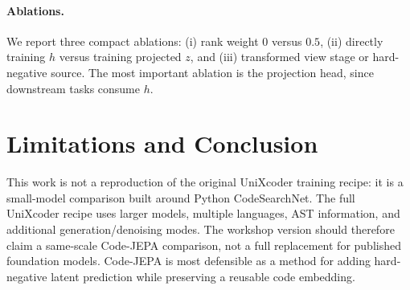 \documentclass[11pt]{article}
\begin{document}
\paragraph{Ablations.}
We report three compact ablations: (i) rank weight \(0\) versus \(0.5\), (ii)
directly training \(h\) versus training projected \(z\), and (iii) transformed
view stage or hard-negative source. The most important ablation is the projection
head, since downstream tasks consume \(h\).

\section{Limitations and Conclusion}

This work is not a reproduction of the original UniXcoder training recipe: it is
a small-model comparison built around Python CodeSearchNet. The full UniXcoder
recipe uses larger models, multiple languages, AST information, and additional
generation/denoising modes. The workshop version should therefore claim a
same-scale Code-JEPA comparison, not a full replacement for published foundation
models. Code-JEPA is most defensible as a method for adding hard-negative latent
prediction while preserving a reusable code embedding.
\end{document}
